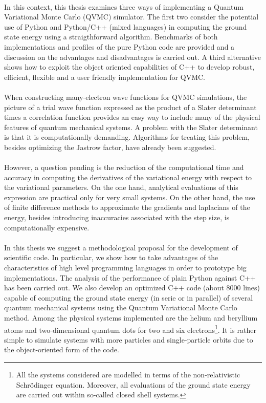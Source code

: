 \\
In this context, this thesis examines three ways of implementing a Quantum Variational Monte Carlo (QVMC) simulator. The  first two consider the potential use of Python and Python/C++ (mixed languages) in computing the ground state energy using a straigthforward algorithm. Benchmarks of both implementations and profiles of the pure Python code are provided and a discussion on the advantages and disadvantages is carried out. A third alternative shows how to exploit the object oriented capabilities of C++ to develop robust, efficient, flexible and a user friendly implementation for QVMC. \\
\\
When constructing many-electron wave functions for QVMC simulations, the picture of a trial wave function expressed as the product of a Slater determinant times a correlation function provides an easy way to include many of the physical features of quantum mechanical systems. A problem with the Slater determinant is that it is computationally demanding. Algorithms for treating this problem, besides optimizing the Jastrow factor, have already been suggested.\\
\\
However, a question pending is the reduction of the computational time and accuracy in  computing the derivatives of the variational energy with respect to the variational parameters. On the one hand, analytical evaluations of this expression are practical only for very small systems. On the other hand, the use of finite difference methods to approximate the gradients and laplacians of the energy, besides introducing inaccuracies associated with the step size, is computationally expensive.\\
\\
In this thesis we suggest a methodological proposal for the development of scientific code. In particular, we show how to take advantages of the characteristics of high level programming languages in order to prototype big implementations.  The analysis of the performance of plain Python against C++ has been carried out. We also develop an optimized C++ code (about 8000 lines) capable of computing the ground state energy (in serie or in parallel) of several quantum mechanical systems using the Quantum Variational Monte Carlo method. Among the physical systems implemented are the helium and beryllium atoms and two-dimensional quantum dots for two and six electrons\footnote{All the systems considered are modelled in terms of the non-relativistic Schr\"odinger equation. Moreover, all evaluations of the ground state energy are carried out within so-called closed shell systems.}. It is rather simple to simulate systems with more particles and single-particle orbits due to the object-oriented form of the code.\\
